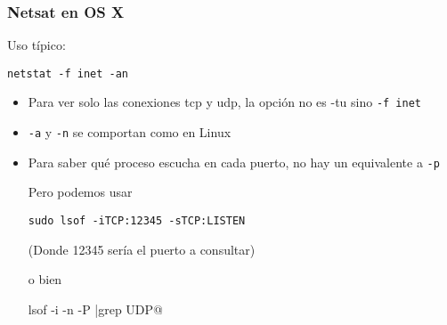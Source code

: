\documentclass[ucs]{beamer}
\begin{document}
\begin{frame}[fragile]
\frametitle{Netsat en OS X}
Uso típico:

\verb|netstat -f inet -an|
\begin{itemize}
\item
Para ver solo las conexiones tcp y udp, la opción no es -tu sino
\verb|-f inet|

\item
\verb|-a| y \verb|-n| se comportan como en Linux

\item
Para saber qué proceso escucha en cada puerto, no hay un equivalente
a  \verb|-p|

Pero podemos usar

\verb|sudo lsof -iTCP:12345 -sTCP:LISTEN|

(Donde 12345 sería el puerto a consultar)

o bien

\verb@sudo lsof -i -n -P |grep UDP@

\end{itemize}

\end{frame}
\end{document}
